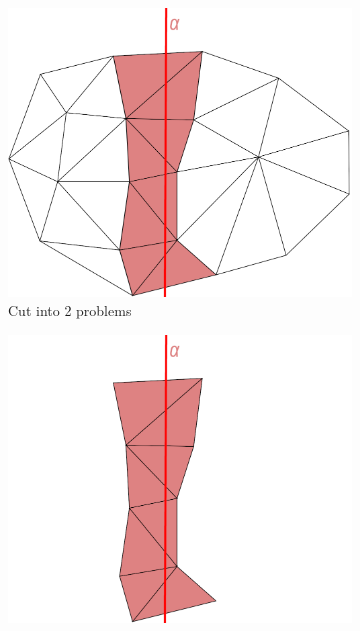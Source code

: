 \begin{figure}[H]
     \centering
     \begin{subfigure}[b]{0.3\textwidth}
         \centering
         \includegraphics[width=\textwidth]{01DeWallMiddle.png}
         \caption{Cut into 2 problems}
         \label{fig:y equals x}
     \end{subfigure}
     \hfill
     \begin{subfigure}[b]{0.3\textwidth}
         \centering
         \includegraphics[width=\textwidth]{01DeWallSolveMiddle.png}

\end{subfigure}
\end{figure}
